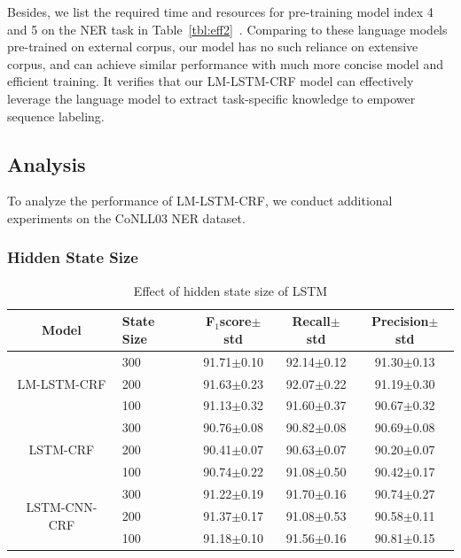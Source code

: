 \documentclass[letterpaper]{article} %
\newcommand{\our}{\textsc{LM-LSTM-CRF}\xspace}
\begin{document}
    Besides, we list the required time and resources for pre-training model index 4 and 5 on the NER task in Table~\ref{tbl:eff2}~\cite{jozefowicz2016exploring}.
    Comparing to these language models pre-trained on external corpus, our model has no such reliance on extensive corpus, and can achieve similar performance with much more concise model and efficient training.
    It verifies that our \our model can effectively leverage the language model to extract task-specific knowledge to empower sequence labeling.

\subsection{Analysis}

    To analyze the performance of \our, we conduct additional experiments on the CoNLL03 NER dataset. 

    \subsubsection{Hidden State Size}


\begin{table}
\center
\scalebox{0.65}
{
\begin{tabular}{c|l|c|c|c}
\hline
Model & State Size & F$_1$score$\pm$std &  Recall$\pm$std &Precision$\pm$std \\
\hline
\hline
\multirow{3}{*}{\our} & 300 &  91.71$\pm$0.10 &92.14$\pm$0.12 & 91.30$\pm$0.13 \\
\cline{2-5}
& 200 & 91.63$\pm$0.23 &92.07$\pm$0.22 & 91.19$\pm$0.30 \\
\cline{2-5}
& 100 & 91.13$\pm$0.32 &91.60$\pm$0.37 & 90.67$\pm$0.32 \\

\hline
\hline
\multirow{3}{*}{LSTM-CRF} & 300 & 90.76$\pm$0.08 &90.82$\pm$0.08 & 90.69$\pm$0.08 \\
\cline{2-5}
& 200 & 90.41$\pm$0.07 &90.63$\pm$0.07 & 90.20$\pm$0.07 \\
\cline{2-5}
& 100 & 90.74$\pm$0.22 &91.08$\pm$0.50 & 90.42$\pm$0.17 \\

\hline
\hline
\multirow{3}{*}{LSTM-CNN-CRF} & 300  & 91.22$\pm$0.19 & 91.70$\pm$0.16 & 90.74$\pm$0.27\\
\cline{2-5}
& 200  & 91.37$\pm$0.17 & 91.08$\pm$0.53 & 90.58$\pm$0.11\\
\cline{2-5}
& 100 & 91.18$\pm$0.10 & 91.56$\pm$0.16 & 90.81$\pm$0.15\\
\hline
\end{tabular}
}
\caption{Effect of hidden state size of LSTM}\label{tbl:size}
\end{table}
\end{document}
